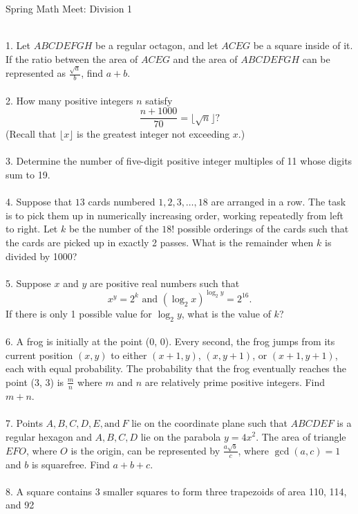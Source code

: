 \noindent 
\begin{center}
    {\huge Spring Math Meet: Division 1 } 
\end{center}
\hfill \break \\ 
{\footnotesize 1. Let $ABCDEFGH$ be a regular octagon, and let $ACEG$ be a square inside of it. If the ratio between the area of $ACEG$ and the area of $ABCDEFGH$ can be represented as $\frac{\sqrt{a}}{b}$, find $a+b$.
\\ \\ 
2. How many positive integers $n$ satisfy\[\frac{n+1000}{70} = \lfloor \sqrt{n} \rfloor?\](Recall that $\lfloor x\rfloor$ is the greatest integer not exceeding $x$.)
\\ \\
3. Determine the number of five-digit positive integer multiples of 11 whose digits sum to 19.
\\ \\
4. Suppose that $13$ cards numbered $1, 2, 3, \ldots, 18$ are arranged in a row. The task is to pick them up in numerically increasing order, working repeatedly from left to right. Let $k$ be the number of the $18!$ possible orderings of the cards such that the cards are picked up in exactly 2 passes. What is the remainder when $k$ is divided by 1000?
\\ \\
5. Suppose $x$ and $y$ are positive real numbers such that\[x^y=2^{k}\text{ and }(\log_2{x})^{\log_2{y}}=2^{16}.\] If there is only 1 possible value for $\log_2{y}$, what is the value of $k$?
\\ \\ 
6. A frog is initially at the point (0, 0). Every second, the frog jumps from its current
position $(x, y)$ to either $(x + 1, y)$, $(x, y + 1)$, or $(x + 1, y + 1)$, each with equal probability.
The probability that the frog eventually reaches the point (3, 3) is $\frac{m}{n}$ where $m$ and $n$ are relatively prime positive integers. Find $m + n$.
\\ \\
7. Points $A, B, C, D, E, \text{and} \ F$ lie on the coordinate plane such that $ABCDEF$ is a regular hexagon and $A, B, C, D$ lie on the parabola $y = 4x^2$. The area of triangle $EFO$, where $O$ is the origin, can be represented by $\frac{a\sqrt{b}}{c}$, where $\gcd(a, c) = 1$ and $b$ is squarefree. Find $a+b+c$.
\\ \\
8. A square contains 3 smaller squares to form three trapezoids of area 110, 114, and 92
}
